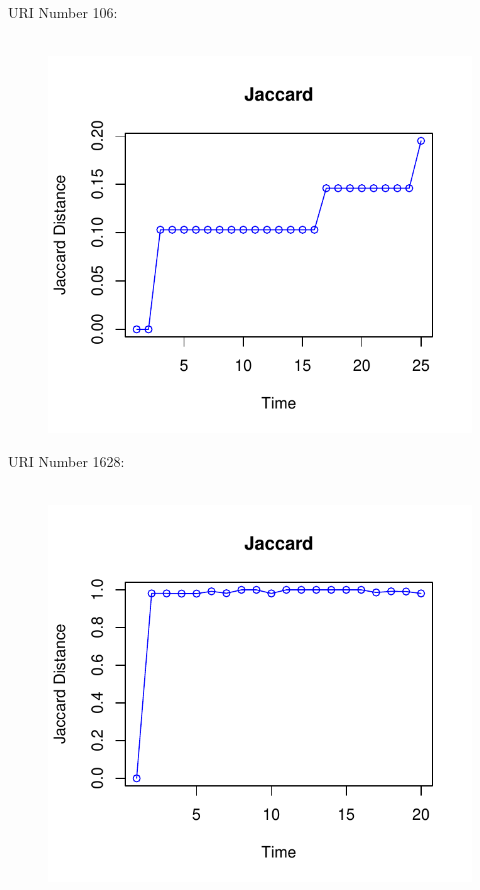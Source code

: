 \documentclass[12pt]{article}
\begin{document}
URI Number 106:\\
\begin{figure}[H]
    \centering
    \includegraphics[scale=0.7]{106.pdf}
\end{figure}

URI Number 1628:\\
\begin{figure}[H]
    \centering
    \includegraphics[scale=0.7]{1628.pdf}
\end{figure}
\end{document}
